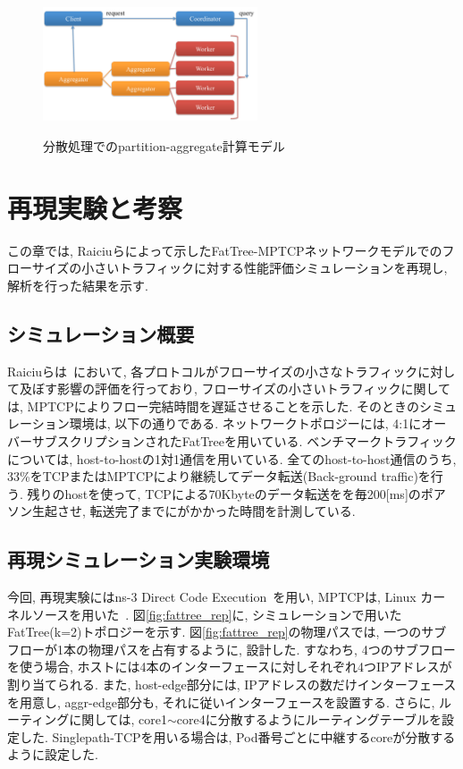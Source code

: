 \documentclass[technicalreport]{ieicej}
\begin{document}
\begin{figure}[h]
    \begin{center}
    \includegraphics[autoebb, width=180pt]{./img/part_aggr.pdf}
    \caption{分散処理でのpartition-aggregate計算モデル}
    \label{fig:part_aggr}
    \end{center}
\end{figure}


\section{再現実験と考察}
\label{sec:reproduction}
この章では,
Raiciuらによって示したFatTree-MPTCPネットワークモデルでのフローサイズの小さいトラフィックに対する性能評価シミュレーションを再現し,
解析を行った結果を示す.

\subsection{シミュレーション概要}
Raiciuらは~\cite{improving}において, 各プロトコルがフローサイズの小さなトラフィックに対して及ぼす影響の評価を行っており,
フローサイズの小さいトラフィックに関しては, MPTCPによりフロー完結時間を遅延させることを示した.
そのときのシミュレーション環境は, 以下の通りである.
ネットワークトポロジーには, 4:1にオーバーサブスクリプションされたFatTreeを用いている.
ベンチマークトラフィックについては, host-to-hostの1対1通信を用いている.
全てのhost-to-host通信のうち, 33\%をTCPまたはMPTCPにより継続してデータ転送(Back-ground traffic)を行う.
残りのhostを使って, TCPによる70Kbyteのデータ転送をを毎200[ms]のポアソン生起させ, 転送完了までにがかかった時間を計測している.

\subsection{再現シミュレーション実験環境}
今回, 再現実験にはns-3 Direct Code Execution~\cite{ns3}を用い, MPTCPは, Linux
カーネルソースを用いた~\cite{mptcp_linux}.
図\ref{fig:fattree_rep}に, シミュレーションで用いたFatTree(k=2)トポロジーを示す.
図\ref{fig:fattree_rep}の物理パスでは, 一つのサブフローが1本の物理パスを占有するように, 設計した.
すなわち, 4つのサブフローを使う場合, ホストには4本のインターフェースに対しそれぞれ4つIPアドレスが割り当てられる.
また, host-edge部分には, IPアドレスの数だけインターフェースを用意し, aggr-edge部分も, それに従いインターフェースを設置する.
さらに, ルーティングに関しては, core1$\sim$core4に分散するようにルーティングテーブルを設定した.
Singlepath-TCPを用いる場合は, Pod番号ごとに中継するcoreが分散するように設定した.
\end{document}
